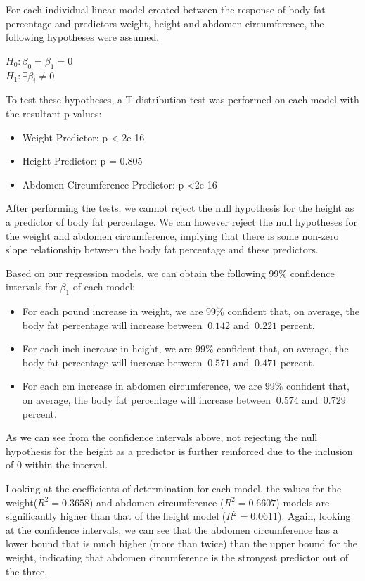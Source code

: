 \documentclass[a4paper, 11pt]{article}
\begin{document}
For each individual linear model created between the response of body fat percentage and predictors weight, height and abdomen circumference, the following hypotheses were assumed.
\begin{center}
	$H_0: \beta_0 = \beta_1 = 0$\\
	$H_1: \exists \beta_i \ne 0$
\end{center}
To test these hypotheses, a T-distribution test was performed on each model with the resultant p-values:
\begin{itemize}
	\item Weight Predictor: p < 2e-16
	\item Height Predictor: p = 0.805
	\item Abdomen Circumference Predictor: p <2e-16
\end{itemize}
After performing the tests, we cannot reject the null hypothesis for the height as a predictor of body fat percentage. We can however reject the null hypotheses for the weight and abdomen circumference, implying that there is some non-zero slope relationship between the body fat percentage and these predictors.

Based on our regression models, we can obtain the following 99\% confidence intervals for $\beta_1$ of each model:
\begin{itemize}
	\item For each pound increase in weight, we are 99\% confident that, on average, the body fat percentage will increase between $~0.142$ and $~0.221$ percent.
	\item For each inch increase in height, we are 99\% confident that, on average, the body fat percentage will increase between $~0.571$ and $~0.471$ percent.
	\item For each cm increase in abdomen circumference, we are 99\% confident that, on average, the body fat percentage will increase between $~0.574$ and $~0.729$ percent.
\end{itemize}
As we can see from the confidence intervals above, not rejecting the null hypothesis for the height as a predictor is further reinforced due to the inclusion of 0 within the interval.

Looking at the coefficients of determination for each model, the values for the weight($R^2 = 0.3658$) and abdomen circumference ($R^2 = 0.6607$) models are significantly higher than that of the height model ($R^2 = 0.0611$). Again, looking at the confidence intervals, we can see that the abdomen circumference has a lower bound that is much higher (more than twice) than the upper bound for the weight, indicating that abdomen circumference is the strongest predictor out of the three.
\end{document}
